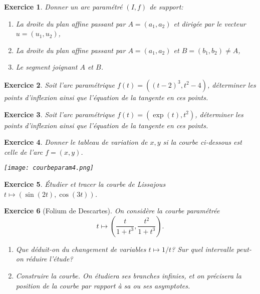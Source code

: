\documentclass[12pt,a4paper]{article}
\theoremstyle{break}
\newtheorem{Exo}{Exercice}
\begin{document}
	

\begin{Exo}
	Donner un arc paramétré $(I,f)$ de support: 
	\begin{enumerate}
		\item
		La droite du plan affine passant par $A=(a_1,a_2)$ et dirigée par le vecteur $u=(u_1,u_2)$,
		\item
		La droite du plan affine passant par $A=(a_1,a_2)$ et  $B=(b_1,b_2)\neq A$,
		\item
		Le segment joignant $A$ et $B$.
	\end{enumerate}
	
\end{Exo}

\begin{Exo}
	Soit l'arc paramétrique $f(t)=\left((t-2)^3,t^2-4\right)$, déterminer les points d'inflexion ainsi que l'équation de la tangente en ces points.
\end{Exo}

\begin{Exo}
		Soit l'arc paramétrique $f(t)=\left(\exp(t),t^2\right)$, déterminer les points d'inflexion ainsi que l'équation de la tangente en ces points.
\end{Exo}

\begin{Exo}
	Donner le tableau de variation de $x,y$ si la courbe ci-dessous est celle de l'arc $f=(x,y)$.
	\begin{center}
	\texttt{[image: courbeparam4.png]}
	\end{center}
\end{Exo}

\begin{Exo}
	\'Etudier et tracer la courbe de Lissajous $t\mapsto (\sin(2t),\cos(3t))$.
\end{Exo}

\begin{Exo}[Folium de Descartes]

	On considère la courbe paramétrée 
	$$t\mapsto \left(\frac{t}{1+t^3},\frac{t^2}{1+t^3}\right).$$
	\begin{enumerate}
		\item Que déduit-on du changement de variables $t\mapsto 1/t$? Sur quel intervalle peut-on réduire l'étude?
		\item Construire la courbe. On étudiera ses branches infinies, et on précisera la position de la courbe par rapport à sa ou ses asymptotes.
	\end{enumerate}
	
\end{Exo}
\end{document}
